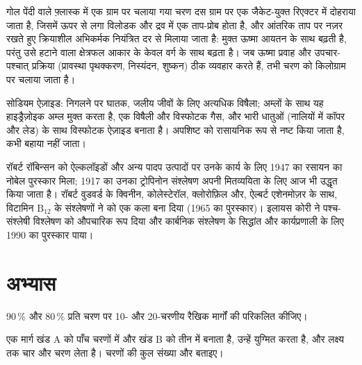 \begin{inthelab}[एक ग्राम से एक किलोग्राम तक]
गोल पेंदी वाले फ़्लास्क में एक ग्राम पर चलाया गया चरण दस ग्राम पर एक
जैकेट-युक्त रिएक्टर में दोहराया जाता है, जिसमें ऊपर से लगा विलोडक और द्रव में एक
ताप-प्रोब होता है, और आंतरिक ताप पर नज़र रखते हुए क्रियाशील अभिकर्मक नियंत्रित दर से
मिलाया जाता है: मुक्त ऊष्मा आयतन के साथ बढ़ती है, परंतु उसे हटाने वाला
क्षेत्रफल आकार के केवल वर्ग के साथ बढ़ता है। जब ऊष्मा प्रवाह और उपचार-पश्चात् प्रक्रिया
(प्रावस्था पृथक्करण, निस्यंदन, शुष्कन) ठीक व्यवहार करते हैं, तभी चरण को किलोग्राम पर चलाया जाता है।
\end{inthelab}

\begin{safety}{}
सोडियम ऐज़ाइड: निगलने पर घातक, जलीय जीवों के लिए अत्यधिक विषैला; अम्लों के साथ यह
हाइड्रैज़ोइक अम्ल मुक्त करता है, एक विषैली और विस्फोटक गैस, और भारी धातुओं
(नालियों में कॉपर और लेड) के साथ विस्फोटक ऐज़ाइड बनाता है। अपशिष्ट को
रासायनिक रूप से नष्ट किया जाता है, कभी बहाया नहीं जाता।
\end{safety}

\begin{history}[रॉबिन्सन, वुडवर्ड, कोरी]
रॉबर्ट रॉबिन्सन को ऐल्कलॉइडों और अन्य पादप उत्पादों पर उनके कार्य के लिए 1947 का
रसायन का नोबेल पुरस्कार मिला; 1917 का उनका ट्रोपिनोन संश्लेषण अपनी मितव्ययिता के लिए
आज भी उद्धृत किया जाता है। रॉबर्ट वुडवर्ड के क्विनीन, कोलेस्टेरॉल,
क्लोरोफ़िल और, ऐल्बर्ट एशेनमोज़र के साथ, विटामिन $\mathrm B_{12}$ के संश्लेषणों ने  को एक कला बना दिया
(1965 का पुरस्कार)। इलायस कोरी ने पश्च-संश्लेषी विश्लेषण को औपचारिक रूप दिया और
कार्बनिक संश्लेषण के सिद्धांत और कार्यप्रणाली के लिए 1990 का पुरस्कार पाया।
\end{history}

\section{अभ्यास}

\begin{exercise}[$\star$]\label{exo:b3:total-synthesis:1}
90\,\% और 80\,\% प्रति चरण पर 10- और 20-चरणीय रैखिक मार्गों की 
परिकलित कीजिए।
\end{exercise}

\begin{exercise}[$\star$]\label{exo:b3:total-synthesis:2}
एक मार्ग खंड A को पाँच चरणों में और खंड B को तीन में बनाता है, उन्हें युग्मित करता है, और
लक्ष्य तक चार और चरण लेता है। चरणों की कुल संख्या और
 बताइए।
\end{exercise}

